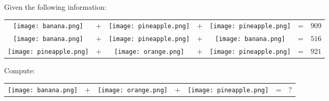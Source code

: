 

\begin{question}
Given the following information:
\begin{center}
\begin{tabular}{ccccccr}
\texttt{[image: banana.png]} & $+$ & \texttt{[image: pineapple.png]} & $+$ & \texttt{[image: pineapple.png]} & = & $909$ \\
\texttt{[image: banana.png]} & $+$ & \texttt{[image: pineapple.png]} & $+$ & \texttt{[image: banana.png]} & = & $516$ \\
\texttt{[image: pineapple.png]} & $+$ & \texttt{[image: orange.png]} & $+$ & \texttt{[image: pineapple.png]} & = & $921$
\end{tabular}
\end{center}

Compute:
\begin{center}
\begin{tabular}{ccccccr}
\texttt{[image: banana.png]} & $+$ & \texttt{[image: orange.png]} & $+$ & \texttt{[image: pineapple.png]} & = & $\text{?}$
\end{tabular}
\end{center}

\end{question}

